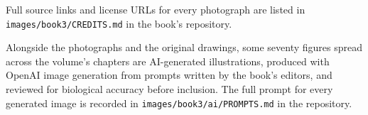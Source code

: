 Full source links and license URLs for every photograph are listed
in \texttt{images/book3/CREDITS.md} in the book's repository.

\bigskip
Alongside the photographs and the original drawings, some seventy
figures spread across the volume's chapters are AI-generated
illustrations, produced with OpenAI image generation from prompts
written by the book's editors, and reviewed for biological accuracy
before inclusion. The full prompt for every generated image is
recorded in \texttt{images/book3/ai/PROMPTS.md} in the repository.
\clearpage
